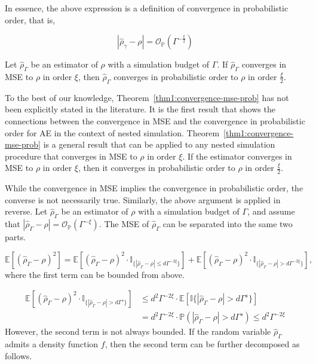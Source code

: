In essence, the above expression is a definition of convergence in probabilistic order, that is,

$$
    \left| \hat{\rho}_{\gamma} - \rho \right| = \mathcal{O}_\mathbb{P} \left( \Gamma^{-\frac{\xi}{2}} \right)
$$

\begin{theorem} \label{thm1:convergence-mse-prob}
    Let $\hat{\rho}_{\Gamma}$ be an estimator of $\rho$ with a simulation budget of $\Gamma$. 
    If $\hat{\rho}_{\Gamma}$ converges in MSE to $\rho$ in order $\xi$, then $\hat{\rho}_{\Gamma}$ converges in probabilistic order to $\rho$ in order $\frac{\xi}{2}$.
\end{theorem}

To the best of our knowledge, Theorem~\ref{thm1:convergence-mse-prob} has not been explicitly stated in the literature.
It is the first result that shows the connections between the convergence in MSE and the convergence in probabilistic order for AE in the context of nested simulation.
Theorem~\ref{thm1:convergence-mse-prob} is a general result that can be applied to any nested simulation procedure that converges in MSE to $\rho$ in order $\xi$.
If the estimator converges in MSE to $\rho$ in order $\xi$, then it converges in probabilistic order to $\rho$ in order $\frac{\xi}{2}$.

While the convergence in MSE implies the convergence in probabilistic order, the converse is not necessarily true.
Similarly, the above argument is applied in reverse.
Let $\hat{\rho}_{\Gamma}$ be an estimator of $\rho$ with a simulation budget of $\Gamma$, and assume that $|\hat{\rho}_{\Gamma} - \rho| = \mathcal{O}_{\mathbb{P}}(\Gamma^{-\xi})$.
The MSE of $\hat{\rho}_{\Gamma}$ can be separated into the same two parts.

$$
    \mathbb{E}\left[ \left(\hat{\rho}_{\Gamma} - \rho\right)^2 \right] = \mathbb{E} \left[ \left(\hat{\rho}_{\Gamma} - \rho\right)^2 \cdot \mathbb{I}_{\{|\hat{\rho}_{\Gamma} - \rho| \leq d\Gamma^{-2\xi}\}} \right] + \mathbb{E} \left[ \left(\hat{\rho}_{\Gamma} - \rho\right)^2 \cdot \mathbb{I}_{\{|\hat{\rho}_{\Gamma} - \rho| > d\Gamma^{-2\xi}\}} \right], 
$$
where the first term can be bounded from above.

\begin{align*}
    \mathbb{E} \left[ \left(\hat{\rho}_{\Gamma} - \rho\right)^2 \cdot \mathbb{I}_{\{|\hat{\rho}_{\Gamma} - \rho| > d\Gamma^s\}} \right] 
    & \leq d^2 \Gamma^{-2\xi} \cdot \mathbb{E} \left[ \mathbb{I}\{|\hat{\rho}_{\Gamma} - \rho| > d\Gamma^s \} \right] \\
    & = d^2 \Gamma^{-2\xi} \cdot \mathbb{P} \left(|\hat{\rho}_{\Gamma} - \rho| > d\Gamma^s \right) \leq d^2 \Gamma^{-2\xi} 
\end{align*}
However, the second term is not always bounded. 
If the random variable $\hat{\rho}_{\Gamma}$ admits a density function $f$, then the second term can be further decomposed as follows.

